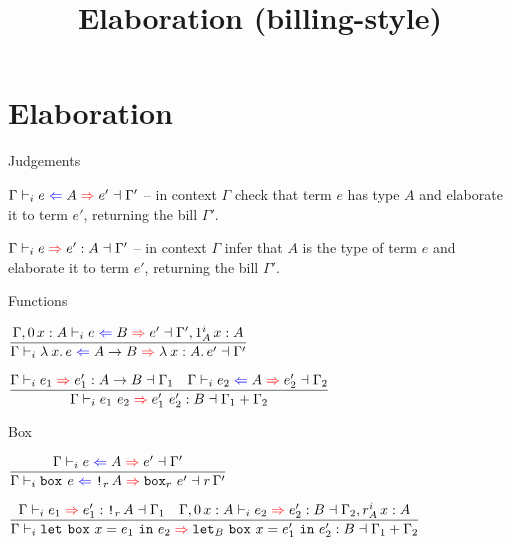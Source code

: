 \documentclass{beamer}
\title{Elaboration (billing-style)}
\begin{document}
\section{Elaboration}

\begin{frame}{Judgements}

$\checkelab{\Gamma}{e}{A}{e'}{\Gamma'}$ -- in context $\Gamma$ check that term $e$ has type $A$ and elaborate it to term $e'$, returning the bill $\Gamma'$.

\vspace{2em}

$\inferelab{\Gamma}{e}{e'}{A}{\Gamma'}$ -- in context $\Gamma$ infer that $A$ is the type of term $e$ and elaborate it to term $e'$, returning the bill $\Gamma'$.

\end{frame}

\begin{frame}{Functions}

\begin{center}
  $\infrule{\checkelab{\extend{\Gamma}[\Zero]{x}{A}}{e}{B}{e'}{\extend{\Gamma'}[\totalqty{\One}{A}]{x}{A}}}{\checkelab{\Gamma}{\fun{x}{e}}{\Fun{A}{B}}{\fun{x}[A]{e'}}{\Gamma'}}$

  \vspace{2em}

  $\infrule{\inferelab{\Gamma}{e_1}{e_1'}{\Fun{A}{B}}{\Gamma_1} \quad \checkelab{\Gamma}{e_2}{A}{e_2'}{\Gamma_2}}{\inferelab{\Gamma}{\app{e_1}{e_2}}{\app{e_1'}{e_2'}}{B}{\addctx{\Gamma_1}{\Gamma_2}}}$
\end{center}

\end{frame}

\begin{frame}{Box}

\begin{center}
  $\infrule{\checkelab{\Gamma}{e}{A}{e'}{\Gamma'}}{\checkelab{\Gamma}{\boxintro{e}}{\Box[r]{A}}{\boxintro[r]{e'}}{\scalectx{r}{\Gamma'}}}$

  \vspace{2em}

  $\infrule{\inferelab{\Gamma}{e_1}{e_1'}{\Box[r]{A}}{\Gamma_1} \quad \inferelab{\extend{\Gamma}[\Zero]{x}{A}}{e_2}{e_2'}{B}{\extend{\Gamma_2}[\totalqty{r}{A}]{x}{A}}}{\inferelab{\Gamma}{\boxelim{x}{e_1}{e_2}}{\boxelim{x}{e_1'}{e_2'}[B]}{B}{\addctx{\Gamma_1}{\Gamma_2}}}$
\end{center}

\end{frame}
\end{document}
